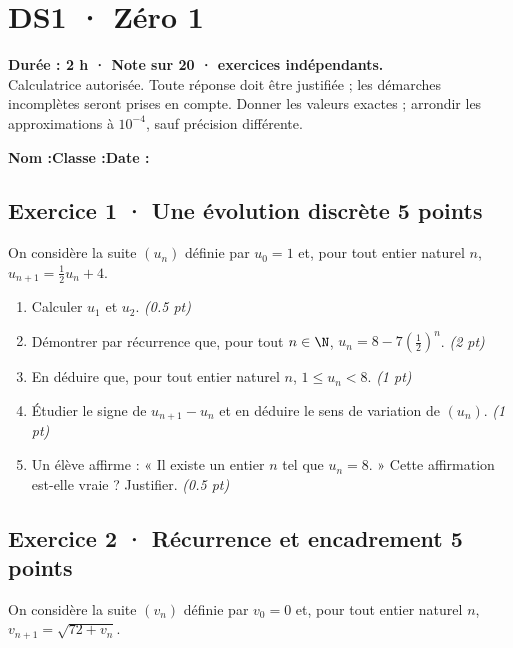 \mxnewpage{}\label{sujet:1-1}

\section*{DS1 · Zéro 1}


\textbf{Durée : 2 h · Note sur 20 ·  exercices indépendants.}\\Calculatrice autorisée. Toute réponse doit être justifiée ; les démarches incomplètes seront prises en compte. Donner les valeurs exactes ; arrondir les approximations à $10^{-4}$, sauf précision différente.

\smallskip\textbf{Nom :}\enspace\dotfill\quad\textbf{Classe :}\enspace\dotfill\quad\textbf{Date :}\enspace\dotfill

\subsection*{Exercice 1 · Une évolution discrète \hfill 5 points}On considère la suite $(u_n)$ définie par $u_0=1$ et, pour tout entier naturel $n$, $u_{n+1}=\frac{1}{2}u_n+4$.

\begin{enumerate}

\item Calculer $u_1$ et $u_2$. \hfill\textit{(\num{0,5} pt)}

\item Démontrer par récurrence que, pour tout $n\in\N$, $u_n=8-7\left(\frac{1}{2}\right)^n$. \hfill\textit{(2 pt)}

\item En déduire que, pour tout entier naturel $n$, $1\le u_n<8$. \hfill\textit{(1 pt)}

\item Étudier le signe de $u_{n+1}-u_n$ et en déduire le sens de variation de $(u_n)$. \hfill\textit{(1 pt)}

\item Un élève affirme : « Il existe un entier $n$ tel que $u_n=8$. » Cette affirmation est-elle vraie ? Justifier. \hfill\textit{(\num{0,5} pt)}

\end{enumerate}

\subsection*{Exercice 2 · Récurrence et encadrement \hfill 5 points}On considère la suite $(v_n)$ définie par $v_0=0$ et, pour tout entier naturel $n$, $v_{n+1}=\sqrt{72+v_n}$.

